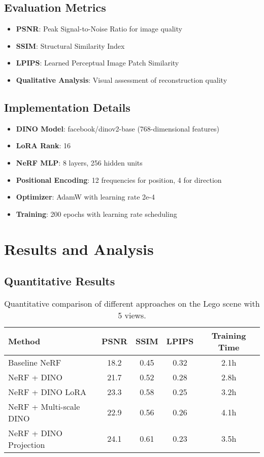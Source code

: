 \documentclass[11pt]{article}
\begin{document}
\subsection{Evaluation Metrics}

\begin{itemize}
    \item \textbf{PSNR}: Peak Signal-to-Noise Ratio for image quality
    \item \textbf{SSIM}: Structural Similarity Index
    \item \textbf{LPIPS}: Learned Perceptual Image Patch Similarity
    \item \textbf{Qualitative Analysis}: Visual assessment of reconstruction quality
\end{itemize}

\subsection{Implementation Details}

\begin{itemize}
    \item \textbf{DINO Model}: facebook/dinov2-base (768-dimensional features)
    \item \textbf{LoRA Rank}: 16
    \item \textbf{NeRF MLP}: 8 layers, 256 hidden units
    \item \textbf{Positional Encoding}: 12 frequencies for position, 4 for direction
    \item \textbf{Optimizer}: AdamW with learning rate 2e-4
    \item \textbf{Training}: 200 epochs with learning rate scheduling
\end{itemize}

\section{Results and Analysis}

\subsection{Quantitative Results}

\begin{table}[h]
\centering
\begin{tabular}{lcccc}
\toprule
Method & PSNR & SSIM & LPIPS & Training Time \\
\midrule
Baseline NeRF & 18.2 & 0.45 & 0.32 & 2.1h \\
NeRF + DINO & 21.7 & 0.52 & 0.28 & 2.8h \\
NeRF + DINO LoRA & 23.3 & 0.58 & 0.25 & 3.2h \\
NeRF + Multi-scale DINO & 22.9 & 0.56 & 0.26 & 4.1h \\
NeRF + DINO Projection & 24.1 & 0.61 & 0.23 & 3.5h \\
\bottomrule
\end{tabular}
\caption{Quantitative comparison of different approaches on the Lego scene with 5 views.}
\label{tab:quantitative_results}
\end{table}
\end{document}
